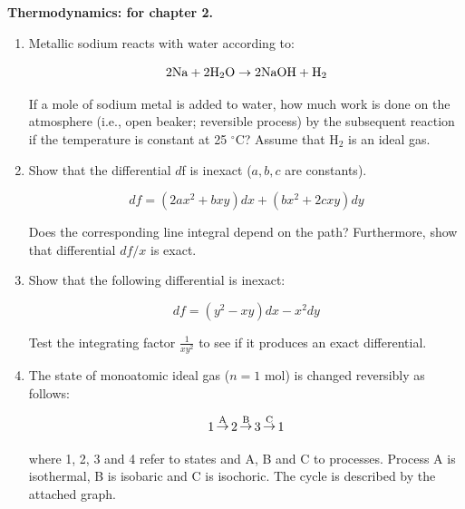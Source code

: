 \noindent
\textbf{Thermodynamics:
 for chapter 2.}\\

\begin{enumerate}

\item Metallic sodium reacts with water according to:

$$2\textnormal{Na} + 2\textnormal{H}_2\textnormal{O} \rightarrow 2\textnormal{NaOH} + \textnormal{H}_2$$

If a mole of sodium metal is added to water, how much work is done on the atmosphere (i.e., open beaker; reversible process) by the subsequent reaction if the temperature is constant at 25 $^\circ$C? Assume that H$_2$ is an ideal gas.


\item Show that the differential $d$f is inexact ($a,b,c$ are constants).

$$df = \left(2ax^2 + bxy\right)dx + \left(bx^2 + 2cxy\right)dy$$

Does the corresponding line integral depend on the path? Furthermore, show that differential $df / x$ is exact.


\item Show that the following differential is inexact:

$$df = \left(y^2 - xy\right)dx - x^2dy$$

Test the integrating factor $\frac{1}{xy^2}$ to see if it produces an exact differential.


\item The state of monoatomic ideal gas ($n = 1$ mol) is changed reversibly as follows:

$$1 \mathop\rightarrow\limits^{\textnormal{A}} 2 \mathop\rightarrow\limits^{\textnormal{B}} 3 \mathop\rightarrow\limits^{\textnormal{C}} 1$$

where 1, 2, 3 and 4 refer to states and A, B and C to processes. Process A is isothermal, B is isobaric and C is isochoric. The cycle is described by the attached graph.


\end{enumerate}
